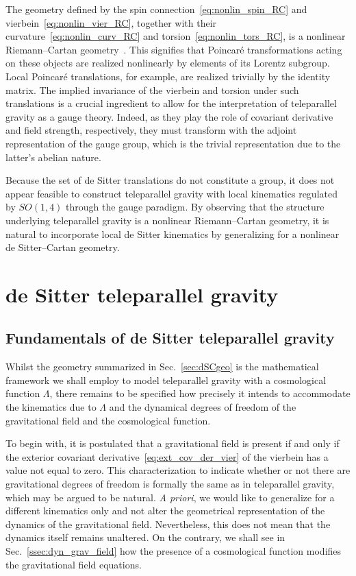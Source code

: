 \documentclass[%
5p,
times,
sort&compress
]{elsarticle}
\begin{document}
The geometry defined by the spin 
connection~\eqref{eq:nonlin_spin_RC} and 
vierbein~\eqref{eq:nonlin_vier_RC}, together with their 
curvature~\eqref{eq:nonlin_curv_RC} and 
torsion~\eqref{eq:nonlin_tors_RC}, is a nonlinear Riemann--Cartan 
geometry~\cite{stelle.west:1980ds, Jennen:2014mba}. This 
signifies that Poincar\'e transformations acting on these objects 
are realized nonlinearly by elements of its Lorentz subgroup.  
Local Poincar\'e translations, for example, are realized 
trivially by the identity matrix. The implied invariance of the 
vierbein and torsion under such translations is a crucial 
ingredient to allow for the interpretation of teleparallel 
gravity as a gauge theory.  Indeed, as they play the role of 
covariant derivative and field strength, respectively, they must 
transform with the adjoint representation of the gauge group, 
which is the trivial representation due to the latter's abelian 
nature.

Because the set of de Sitter translations do not constitute 
a group, it does not appear feasible to construct teleparallel 
gravity with local kinematics regulated by $SO(1,4)$ through the 
gauge paradigm. By observing that the structure underlying 
teleparallel gravity is a nonlinear Riemann--Cartan geometry, it 
is natural to incorporate local de Sitter kinematics by 
generalizing for a nonlinear de Sitter--Cartan geometry.


\section{de Sitter teleparallel gravity}
\label{sec:dStg}

\subsection{Fundamentals of de Sitter teleparallel gravity}

Whilst the geometry summarized in Sec.~\ref{sec:dSCgeo} is the 
mathematical framework we shall employ to model teleparallel 
gravity with a cosmological function $\Lambda$, there remains to 
be specified how precisely it intends to accommodate the 
kinematics due to $\Lambda$ and the dynamical degrees of freedom 
of the gravitational field and the cosmological function.

To begin with, it is postulated that a gravitational field is 
present if and only if the exterior covariant 
derivative~\eqref{eq:ext_cov_der_vier} of the vierbein has 
a value not equal to zero. This characterization to indicate 
whether or not there are gravitational degrees of freedom is 
formally the same as in teleparallel gravity, which may be argued 
to be natural. \emph{A priori}, we would like to generalize for 
a different kinematics only and not alter the geometrical 
representation of the dynamics of the gravitational field.  
Nevertheless, this does not mean that the dynamics itself remains 
unaltered. On the contrary, we shall see in 
Sec.~\ref{ssec:dyn_grav_field} how the presence of a cosmological 
function modifies the gravitational field equations.
\end{document}
